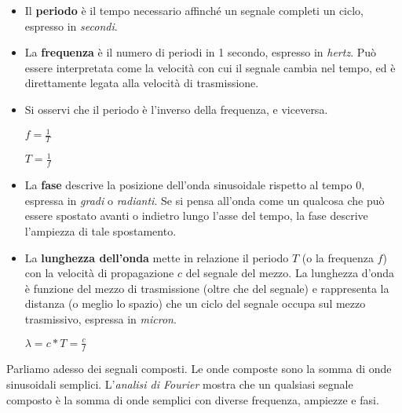         \begin{itemize}
        
        \item 
            Il \textbf{periodo} è il tempo necessario affinché un segnale completi un ciclo, espresso in \textit{secondi}.
        
        \item
            La \textbf{frequenza} è il numero di periodi in 1 secondo, espresso in \textit{hertz}. Può essere interpretata come la velocità con cui il segnale cambia nel tempo, ed è direttamente legata alla velocità di trasmissione.
        
        \item
            Si osservi che il periodo è l'inverso della frequenza, e viceversa.
        
            \begin{center}
                \(f=\frac{1}{T}\)
                
                \(T=\frac{1}{f}\)
            \end{center}
        
        \item
            La \textbf{fase} descrive la posizione dell'onda sinusoidale rispetto al tempo 0, espressa in \textit{gradi} o \textit{radianti}. Se si pensa all'onda come un qualcosa che può essere spostato avanti o indietro lungo l'asse del tempo, la fase descrive l'ampiezza di tale spostamento.
        
        \item
            La \textbf{lunghezza dell'onda} mette in relazione il periodo \(T\) (o la frequenza \(f\)) con la velocità di propagazione \(c\) del segnale del mezzo. La lunghezza d'onda è funzione del mezzo di trasmissione (oltre che del segnale) e rappresenta la distanza (o meglio lo spazio) che un ciclo del segnale occupa sul mezzo trasmissivo, espressa in \textit{micron}.
        
            \begin{center}
                \(\lambda=c*T=\frac{c}{f}\)
            \end{center}
        \end{itemize}
    
        Parliamo adesso dei segnali composti. Le onde composte sono la somma di onde sinusoidali semplici. L'\textit{analisi di Fourier} mostra che un qualsiasi segnale composto è la somma di onde semplici con diverse frequenza, ampiezze e fasi.
        
